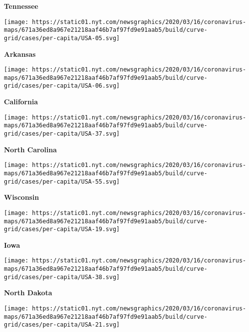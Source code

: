 \textbf{Tennessee}

\href{https://www.nytimes.com/interactive/2020/us/arkansas-coronavirus-cases.html}{}

\texttt{[image: https://static01.nyt.com/newsgraphics/2020/03/16/coronavirus-maps/671a36ed8a967e21218aaf46b7af97fd9e91aab5/build/curve-grid/cases/per-capita/USA-05.svg]}

\textbf{Arkansas}

\href{https://www.nytimes.com/interactive/2020/us/california-coronavirus-cases.html}{}

\texttt{[image: https://static01.nyt.com/newsgraphics/2020/03/16/coronavirus-maps/671a36ed8a967e21218aaf46b7af97fd9e91aab5/build/curve-grid/cases/per-capita/USA-06.svg]}

\textbf{California}

\href{https://www.nytimes.com/interactive/2020/us/north-carolina-coronavirus-cases.html}{}

\texttt{[image: https://static01.nyt.com/newsgraphics/2020/03/16/coronavirus-maps/671a36ed8a967e21218aaf46b7af97fd9e91aab5/build/curve-grid/cases/per-capita/USA-37.svg]}

\textbf{North Carolina}

\href{https://www.nytimes.com/interactive/2020/us/wisconsin-coronavirus-cases.html}{}

\texttt{[image: https://static01.nyt.com/newsgraphics/2020/03/16/coronavirus-maps/671a36ed8a967e21218aaf46b7af97fd9e91aab5/build/curve-grid/cases/per-capita/USA-55.svg]}

\textbf{Wisconsin}

\href{https://www.nytimes.com/interactive/2020/us/iowa-coronavirus-cases.html}{}

\texttt{[image: https://static01.nyt.com/newsgraphics/2020/03/16/coronavirus-maps/671a36ed8a967e21218aaf46b7af97fd9e91aab5/build/curve-grid/cases/per-capita/USA-19.svg]}

\textbf{Iowa}

\href{https://www.nytimes.com/interactive/2020/us/north-dakota-coronavirus-cases.html}{}

\texttt{[image: https://static01.nyt.com/newsgraphics/2020/03/16/coronavirus-maps/671a36ed8a967e21218aaf46b7af97fd9e91aab5/build/curve-grid/cases/per-capita/USA-38.svg]}

\textbf{North Dakota}

\href{https://www.nytimes.com/interactive/2020/us/kentucky-coronavirus-cases.html}{}

\texttt{[image: https://static01.nyt.com/newsgraphics/2020/03/16/coronavirus-maps/671a36ed8a967e21218aaf46b7af97fd9e91aab5/build/curve-grid/cases/per-capita/USA-21.svg]}


